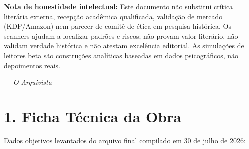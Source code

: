 \documentclass[14pt,openany]{extbook}
\newcommand{\ornamento}{\begin{center}\pgfornament[width=3.6cm,color=customgold]{85}\end{center}}
\begin{document}
\vspace{0.4em}
\noindent\textbf{Nota de honestidade intelectual:} Este documento não substitui crítica literária externa, recepção acadêmica qualificada, validação de mercado (KDP/Amazon) nem parecer de comitê de ética em pesquisa histórica. Os scanners ajudam a localizar padrões e riscos; não provam valor literário, não validam verdade histórica e não atestam excelência editorial. As simulações de leitores beta são construções analíticas baseadas em dados psicográficos, não depoimentos reais.

\vspace{0.4em}
\noindent\hfill--- \textit{O Arquivista}

\ornamento

\tableofcontents

\mainmatter
\hypersetup{pageanchor=true}

\chapter*{1. Ficha Técnica da Obra}

\noindent Dados objetivos levantados do arquivo final compilado em 30 de julho de 2026:

\vspace{0.6em}
\end{document}
